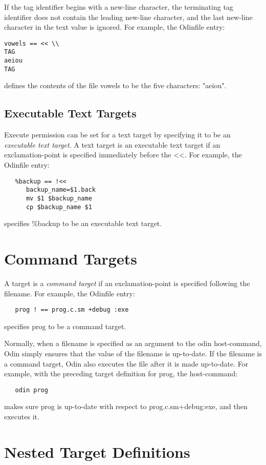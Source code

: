 If the tag identifier begins with a new-line character,
the terminating tag identifier does not contain the leading
new-line character,
and the last new-line character in the text value is ignored.
For example, the {\ex Odinfile} entry:
\begin{verbatim}
vowels == << \\
TAG
aeiou
TAG
\end{verbatim}
defines the contents of the file {\ex vowels} to be the
five characters: "{\ex aeiou}".

\subsection{Executable Text Targets}
\label{executabletarget}

Execute permission can be set for a text target by specifying
it to be an {\em executable text target}.
A text target is an executable text target
if an exclamation-point is specified immediately before the {\ex <<}.
For example, the {\ex Odinfile} entry:
\begin{verbatim}
   %backup == !<<
      backup_name=$1.back
      mv $1 $backup_name
      cp $backup_name $1
\end{verbatim}
specifies {\ex \%backup} to be an executable text target.


\section{Command Targets}
\label{commandtarget}

A target is a {\em command target}
if an exclamation-point is specified following the filename.
For example, the {\ex Odinfile} entry:
\begin{verbatim}
   prog ! == prog.c.sm +debug :exe
\end{verbatim}
specifies {\ex prog} to be a command target.

Normally, when a filename is specified as an argument
to the {\ex odin} host-command,
Odin simply ensures that the value of the filename is up-to-date.
If the filename is a command target,
Odin also executes the file after it is made up-to-date.
For example, with the preceding target definition for {\ex prog},
the host-command:
\begin{verbatim}
   odin prog
\end{verbatim}
makes sure {\ex prog} is up-to-date with respect to
{\ex prog.c.sm+debug:exe}, and then executes it.


\section{Nested Target Definitions}
\label{nestedtarget}

